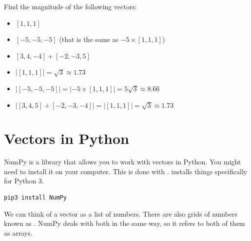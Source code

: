 \begin{center}
\end{center}

\begin{Exercise}[title={Magnitude of a Vector}, label=vector_mag]
    Find the magnitude of the following vectors:
    \begin{itemize}
        \item $[1, 1, 1]$
        \item $[-5, -5, -5]$ (that is the same as $-5 \times [1, 1, 1]$)
        \item $[3, 4, -4] + [-2, -3, 5]$
    \end{itemize}
    \end{Exercise}
    \begin{Answer}[ref=vector_mag]
        \begin{itemize}
            \item $|[1, 1, 1]| = \sqrt{3} \approx 1.73 $
            \item $|[-5, -5, -5]| = |-5 \times [1,1,1]| = 5 \sqrt{3} \approx 
            8.66$
            \item $|[3, 4, 5] + [-2, -3, -4]| = | [1,1,1] | = \sqrt{3} 
            \approx 1.73$ 
        \end{itemize}
    \end{Answer}

\section{Vectors in Python}

NumPy is a library that allows you to work with vectors in Python. You might 
need to install it on your computer. This is done with . 
 installs things specifically for Python 3.

\begin{Verbatim}
pip3 install NumPy
\end{Verbatim}

We can think of a vector as a list of numbers.  
There are also grids of numbers known as . NumPy deals with 
both in the same way, so it refers to both of them as arrays.

